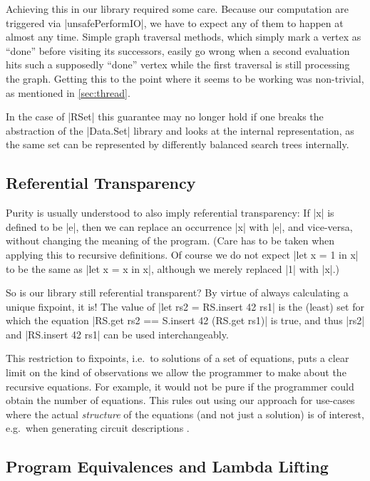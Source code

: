 \documentclass[manuscript,screen,acmsmall,nonacm]{acmart}
\begin{document}
Achieving this in our library required some care. Because our computation are triggered via |unsafePerformIO|, we have to expect any of them to happen at almost any time. Simple graph traversal methods, which simply mark a vertex as “done” before visiting its successors, easily go wrong when a second evaluation hits such a supposedly “done” vertex while the first traversal is still processing the graph. Getting this to the point where it seems to be working was non-trivial, as mentioned in \cref{sec:thread}.

In the case of |RSet| this guarantee may no longer hold if one breaks the abstraction of the |Data.Set| library and looks at the internal representation, as the same set can be represented by differently balanced search trees internally.

\subsection{Referential Transparency}\label{sec:reftrans}

Purity is usually understood to also imply referential transparency: If |x| is defined to be |e|, then we can replace an occurrence |x| with |e|, and vice-versa, without changing the meaning of the program.
(Care has to be taken when applying this to recursive definitions. Of course we do not expect |let x = 1 in x| to be the same as |let x = x in x|, although we merely replaced |1| with |x|.)

So is our library still referential transparent? By virtue of always calculating a unique fixpoint, it is!  The value of |let rs2 = RS.insert 42 rs1| is the (least) set for which the equation |RS.get rs2 == S.insert 42 (RS.get rs1)| is true, and thus |rs2| and |RS.insert 42 rs1| can be used interchangeably.

This restriction to fixpoints, i.e.\ to solutions of a set of equations, puts a clear limit on the kind of observations we allow the programmer to make about the recursive equations. For example, it would not be pure if the programmer could obtain the number of equations. This rules out using our approach for use-cases where the actual \emph{structure} of the equations (and not just a solution) is of interest, e.g.\ when generating circuit descriptions \cite{observable-sharing}.

\subsection{Program Equivalences and Lambda Lifting}\label{sec:sat}
\end{document}
